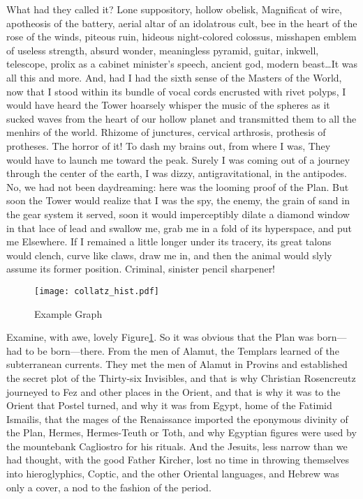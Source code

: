 \documentclass[11pt]{article}
\begin{document}
What had they called it? Lone suppository, hollow obelisk, Magnificat
of wire, apotheosis of the battery, aerial altar of an idolatrous
cult, bee in the heart of the rose of the winds, piteous ruin,
hideous night-colored colossus, misshapen emblem of useless strength,
absurd wonder, meaningless pyramid, guitar, inkwell, telescope,
prolix as a cabinet minister’s speech, ancient god, modern beast\ldots It
was all this and more. And, had I had the sixth sense of the Masters
of the World, now that I stood within its bundle of vocal cords
encrusted with rivet polyps, I would have heard the Tower hoarsely
whisper the music of the spheres as it sucked waves from the heart
of our hollow planet and transmitted them to all the menhirs of the
world. Rhizome of junctures, cervical arthrosis, prothesis of
protheses. The horror of it! To dash my brains out, from where I
was, They would have to launch me toward the peak. Surely I was
coming out of a journey through the center of the earth, I was
dizzy, antigravitational, in the antipodes.  No, we had not been
daydreaming: here was the looming proof of the Plan. But soon the
Tower would realize that I was the spy, the enemy, the grain of
sand in the gear system it served, soon it would imperceptibly
dilate a diamond window in that lace of lead and swallow me, grab
me in a fold of its hyperspace, and put me Elsewhere.  If I remained
a little longer under its tracery, its great talons would clench,
curve like claws, draw me in, and then the animal would slyly assume
its former position. Criminal, sinister pencil sharpener!

\begin{figure}[tbp]
\begin{centering}
\texttt{[image: collatz\_hist.pdf]}
\caption{Example Graph}\label{fig:ex}
\end{centering}
\end{figure}

Examine, with awe, lovely Figure\xspace\ref{fig:ex}.
So it was obvious that the Plan was born---had to be born---there. From
the men of Alamut, the Templars learned of the subterranean currents.
They met the men of Alamut in Provins and established the secret
plot of the Thirty-six Invisibles, and that is why Christian
Rosencreutz journeyed to Fez and other places in the Orient, and
that is why it was to the Orient that Postel turned, and why it was
from Egypt, home of the Fatimid Ismailis, that the mages of the
Renaissance imported the eponymous divinity of the Plan, Hermes,
Hermes-Teuth or Toth, and why Egyptian figures were used by the
mountebank Cagliostro for his rituals. And the Jesuits, less narrow
than we had thought, with the good Father Kircher, lost no time in
throwing themselves into hieroglyphics, Coptic, and the other
Oriental languages, and Hebrew was only a cover, a nod to the fashion
of the period.
\end{document}
